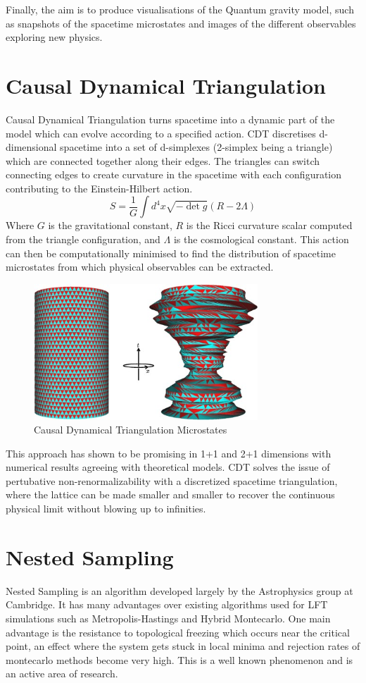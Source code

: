 \documentclass[a4paper]{article}
\begin{document}
    Finally, the aim is to produce visualisations of the Quantum gravity model, such as snapshots of the spacetime microstates and images of the different observables exploring new physics.

    \section{Causal Dynamical Triangulation}
    Causal Dynamical Triangulation turns spacetime into a dynamic part of the model which can evolve according to a specified action. CDT discretises d-dimensional spacetime into a set of d-simplexes (2-simplex being a triangle) which are connected together along their edges. The triangles can switch connecting edges to create curvature in the spacetime with each configuration contributing to the Einstein-Hilbert action. 
    $$S = \frac{1}{G} \int{d^4x \sqrt{ - \det g} ( R - 2\Lambda ) } $$
    Where $G$ is the gravitational constant, $R$ is the Ricci curvature scalar computed from the triangle configuration, and $\Lambda$ is the cosmological constant. This action can then be computationally minimised to find the distribution of spacetime microstates from which physical observables can be extracted.

\begin{figure}[H]
\centering
\includegraphics[width=0.75\textwidth]{cdt}
\caption{Causal Dynamical Triangulation Microstates\cite{3}}
\end{figure}

    This approach has shown to be promising in 1+1 and 2+1 dimensions with numerical results agreeing with theoretical models. CDT solves the issue of pertubative non-renormalizability with a discretized spacetime triangulation, where the lattice can be made smaller and smaller to recover the continuous physical limit without blowing up to infinities. 

    \section{Nested Sampling}
    Nested Sampling is an algorithm developed largely by the Astrophysics group at Cambridge. It has many advantages over existing algorithms used for LFT simulations such as Metropolis-Hastings\cite{2} and Hybrid Montecarlo. One main advantage is the resistance to topological freezing which occurs near the critical point, an effect where the system gets stuck in local minima and rejection rates of montecarlo methods become very high. This is a well known phenomenon and is an active area of research.
\end{document}
